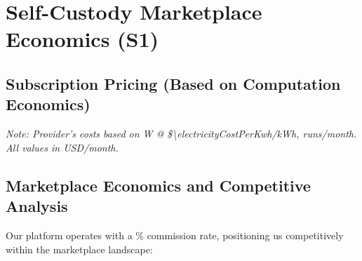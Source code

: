 
\section{Self-Custody Marketplace Economics (S1)}

\subsection{Subscription Pricing (Based on Computation Economics)}
\begin{table}[H]
\centering
\caption{Anonymous Computation Marketplace Economics}
\end{table}
\textit{Note: Provider's costs based on \numint{\computePowerWatts}W @ \$\num{\electricityCostPerKwh}/kWh, \numfpeval{\weeklyRunsPerMonth} runs/month. All values in USD/month.}

\subsection{Marketplace Economics and Competitive Analysis}
Our platform operates with a \markPlatformFeePercent\% commission rate, positioning us competitively within the marketplace landscape:

